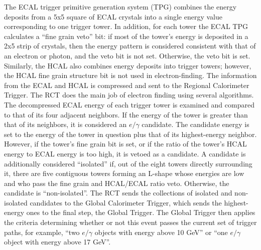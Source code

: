 The ECAL trigger primitive generation system (TPG) combines the energy deposits 
from a 5x5 square of ECAL crystals into a single energy value corresponding to 
one trigger tower. %
In addition, for each tower the ECAL TPG calculates a ``fine grain veto'' bit: 
if most of the tower's energy is deposited in a 2x5 strip of crystals, 
then the energy pattern is considered consistent with that of an electron
or photon, 
and the veto bit is not set.  
Otherwise, the veto bit is set.  
Similarly, the HCAL also combines energy deposits into trigger towers; 
however, the HCAL fine grain structure bit is not used in electron-finding.  
The information from the ECAL and HCAL is compressed and sent to the 
Regional Calorimeter Trigger.  
The RCT does the main job of electron finding using several algorithms.  
The decompressed ECAL energy of each trigger tower is examined and 
compared to that of its four adjacent neighbors.  
If the energy of the tower is greater than that of its neighbors, 
it is considered an $e/\gamma$ candidate.  
The candidate energy is set to the energy of the tower in question 
plus that of its highest-energy neighbor.  
However, if the tower's fine grain bit is set, 
or if the ratio of the tower's HCAL energy to ECAL energy is too high, 
it is vetoed as a candidate.  
A candidate is additionally considered ``isolated'' if, 
out of the eight towers directly surrounding it, 
there are five contiguous towers forming an L-shape whose 
energies are low and who pass the fine grain and HCAL/ECAL ratio veto.  
Otherwise, the candidate is ``non-isolated''.  
The RCT sends the collections of isolated and non-isolated candidates to the 
Global Calorimeter Trigger, 
which sends the highest-energy ones to the final step, the Global Trigger.  
The Global Trigger then applies the criteria determining whether or not 
this event passes the current set of trigger paths,
for example, ``two $e/\gamma$ objects with energy above 10 GeV'' 
or ``one $e/\gamma$ object with energy above 17 GeV''.  




